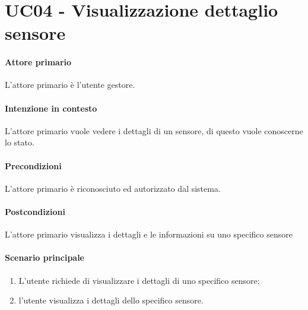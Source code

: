 \section{UC04 - Visualizzazione dettaglio sensore}
\paragraph{Attore primario} L'attore primario è l'utente gestore.
\paragraph{Intenzione in contesto} L'attore primario vuole vedere i dettagli di un sensore, di questo vuole conoscerne lo stato.
\paragraph{Precondizioni}L'attore primario è riconosciuto ed autorizzato dal sistema.
\paragraph{Postcondizioni} L'attore primario visualizza i dettagli e le informazioni su uno specifico sensore
\paragraph{Scenario principale}
\begin{enumerate}
    \item L'utente richiede di visualizzare i dettagli di uno specifico sensore;
    \item l'utente visualizza i dettagli dello specifico sensore.
\end{enumerate}